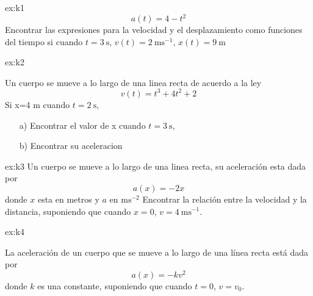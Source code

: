 \begin{multicols}{2}
\begin{excercise}[][][$v(t) = \displaystyle{4t-\frac{t^3}{3}-1}\ (\mathrm{ms^{-1}})$, $x(t)=\displaystyle{2t^4-\frac{t^4}{12}-t-\frac{3}{4}} \ (\mathrm{m})$]{ex:k1}
{\begin{equation*}
             a(t)=4-t^2 
         \end{equation*}
         Encontrar las expresiones para la velocidad y el desplazamiento como funciones del tiempo si cuando $t=3 \ \mathrm{s}$, $v(t)=2 \ \mathrm{ms^{-1}}$, $x(t)=9 \ \mathrm{m}$
         }
     \end{excercise}   
    \begin{excercise}[][][a) $x = 47.58 \mathrm{m}$; b) $a=51 \ (\mathrm{ms^{-2}})$]{ex:k2}{
         Un cuerpo se mueve a lo largo de una linea recta de acuerdo a la ley 
         \begin{equation*}
             v(t)=t^3+4t^2+2
         \end{equation*}
         Si x=4 m cuando $t=2\ \mathrm{s}$,
            \begin{itemize}
                \item[a)] Encontrar el valor de x cuando  $t=3 \ \mathrm{s}$,
                \item[b)] Encontrar  su aceleracion
            \end{itemize}
        }
    \end{excercise}      
    \begin{excercise}[][][$v(x) = \sqrt{16-2x^2}$]{ex:k3}{
         Un cuerpo se mueve a lo largo de una linea recta, su aceleración esta dada por 
         \begin{equation*}
             a(x)=-2x 
         \end{equation*}
         donde $x$ esta en metros y $a$ en $\mathrm{ms^{-2}}$ Encontrar la relación entre la velocidad y la distancia, suponiendo que cuando $x=0$,  $v=4 \ \mathrm{ms^{-1}}$.
         }
    \end{excercise}
    \begin{excercise}[][][a) $v(t) = \displaystyle{\frac{v_0}{1+kv_0t}}$, $x(t)=x_0+\displaystyle{\frac{1}{k}}\ln(1+kv_0t)$; b) $v(x)=\displaystyle{v_0e^{-k(x-x_0)}}$]{ex:k4}{
         La aceleración de un cuerpo que se mueve a lo largo de una línea recta está dada por
         \begin{equation*}
             a(x)=-kv^2 
         \end{equation*}
         donde $k$ es una constante, suponiendo que cuando $t=0$,  $v=v_0$.
         \begin{itemize}

\end{itemize}}
\end{excercise}
\end{multicols}
